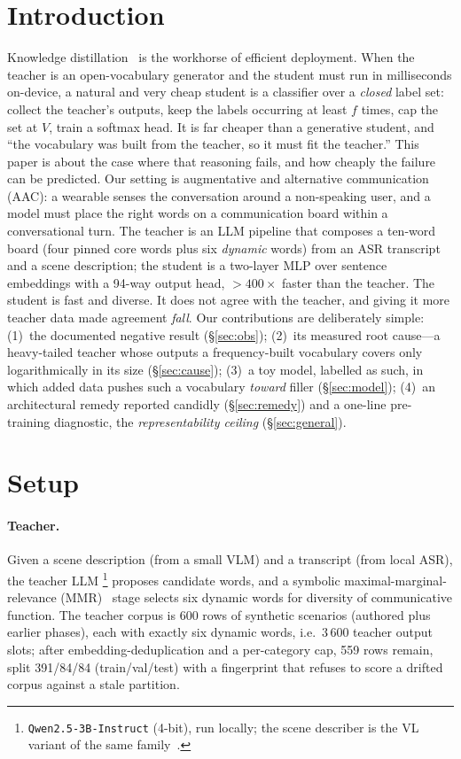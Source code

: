 \section{Introduction}
Knowledge distillation~\citep{hinton2015} is the workhorse of efficient
deployment. When the teacher is an open-vocabulary generator and the student
must run in milliseconds on-device, a natural and very cheap student is a
classifier over a \emph{closed} label set: collect the teacher's outputs, keep
the labels occurring at least $f$ times, cap the set at $V$, train a softmax
head. It is far cheaper than a generative student, and ``the vocabulary was
built from the teacher, so it must fit the teacher.'' This paper is about the
case where that reasoning fails, and how cheaply the failure can be predicted.
Our setting is augmentative and alternative communication (AAC): a wearable
senses the conversation around a non-speaking user, and a model must place the
right words on a communication board within a conversational turn. The teacher is an LLM pipeline that
composes a ten-word board (four pinned core words plus six \emph{dynamic}
words) from an ASR transcript and a scene description; the student is a
two-layer MLP over sentence embeddings with a 94-way output head, ${>}400\times$
faster than the teacher. The student is fast and diverse. It does not agree
with the teacher, and giving it more teacher data made agreement \emph{fall}.
Our contributions are deliberately simple: (1)~the documented negative result
(\S\ref{sec:obs}); (2)~its measured root cause---a heavy-tailed teacher whose
outputs a frequency-built vocabulary covers only logarithmically in its size
(\S\ref{sec:cause}); (3)~a toy model, labelled as such, in which added data
pushes such a vocabulary \emph{toward} filler (\S\ref{sec:model}); (4)~an
architectural remedy reported candidly (\S\ref{sec:remedy}) and a one-line
pre-training diagnostic, the \emph{representability ceiling}
(\S\ref{sec:general}).

\section{Setup}
\label{sec:setup}
\paragraph{Teacher.} Given a scene description (from a small VLM) and a
transcript (from local ASR), the teacher LLM%
\footnote{\texttt{Qwen2.5-3B-Instruct} (4-bit), run locally; the scene
describer is the VL variant of the same family~\citep{qwen25vl}.}
proposes candidate words, and a symbolic maximal-marginal-relevance
(MMR)~\citep{mmr1998} stage selects six dynamic words for diversity of
communicative function. The teacher corpus is 600 rows of synthetic scenarios
(authored plus earlier phases), each with exactly six dynamic words, i.e.\
$3\,600$ teacher output slots; after embedding-deduplication and a per-category
cap, 559 rows remain, split 391/84/84 (train/val/test) with a fingerprint that
refuses to score a drifted corpus against a stale partition.

